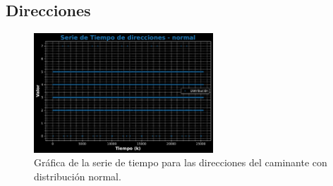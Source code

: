 \documentclass[11pt]{article} %
\begin{document}
 	\subsection{Direcciones}
	 \begin{figure}[h]
	 	\centering
	 	\includegraphics[width=0.6\textwidth]{graf_direcciones_normal.pdf}
	 	\caption{Gráfica de la serie de tiempo para las direcciones del caminante con distribución normal.}
	 	\label{fig:direcNormalGraf}
	 \end{figure}
\end{document}
